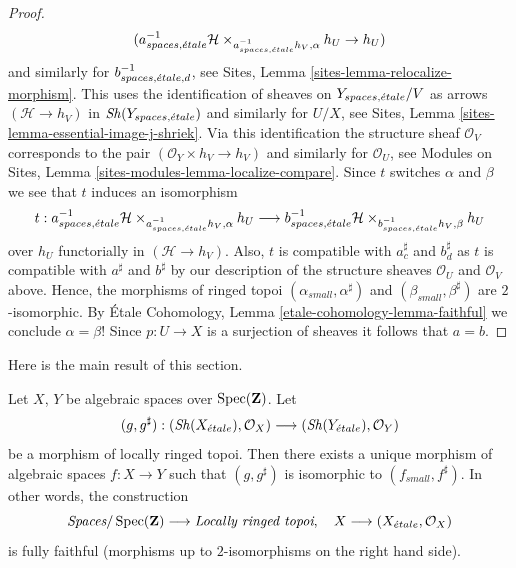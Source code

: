 \begin{proof}
$$(a_{spaces, {\acute{e}tale}}^{-1}\mathcal{H}
\times_{a_{spaces, {\acute{e}tale}}^{-1}h_V, \alpha}
h_U \to
h_U)
$$
and similarly for $b_{spaces, {\acute{e}tale}, d}^{-1}$, see
Sites, Lemma \ref{sites-lemma-relocalize-morphism}.
This uses the identification of sheaves on $Y_{spaces, {\acute{e}tale}}/V$
as arrows $(\mathcal{H} \to h_V)$ in $\mathop{\mathit{Sh}}\nolimits(Y_{spaces, {\acute{e}tale}})$
and similarly for $U/X$, see
Sites, Lemma \ref{sites-lemma-essential-image-j-shriek}.
Via this identification the structure sheaf $\mathcal{O}_V$ corresponds to the
pair $(\mathcal{O}_Y \times h_V \to h_V)$ and similarly
for $\mathcal{O}_U$, see
Modules on Sites,
Lemma \ref{sites-modules-lemma-localize-compare}.
Since $t$ switches $\alpha$ and $\beta$ we see that $t$ induces an isomorphism
$$
t :
a_{spaces, {\acute{e}tale}}^{-1}\mathcal{H}
\times_{a_{spaces, {\acute{e}tale}}^{-1}h_V, \alpha}
h_U
\longrightarrow
b_{spaces, {\acute{e}tale}}^{-1}\mathcal{H}
\times_{b_{spaces, {\acute{e}tale}}^{-1}h_V, \beta}
h_U
$$
over $h_U$ functorially in $(\mathcal{H} \to h_V)$. Also, $t$ is compatible
with $a_c^\sharp$ and $b_d^\sharp$ as $t$ is
compatible with $a^\sharp$ and $b^\sharp$ by our description
of the structure sheaves $\mathcal{O}_U$ and $\mathcal{O}_V$
above. Hence, the morphisms of ringed topoi
$(\alpha_{small}, \alpha^\sharp)$ and $(\beta_{small}, \beta^\sharp)$
are $2$-isomorphic. By
\'Etale Cohomology, Lemma \ref{etale-cohomology-lemma-faithful}
we conclude $\alpha = \beta$! Since $p : U \to X$ is a surjection
of sheaves it follows that $a = b$.
\end{proof}

\noindent
Here is the main result of this section.

\begin{theorem}
\label{theorem-fully-faithful}
Let $X$, $Y$ be algebraic spaces over $\mathop{\mathrm{Spec}}(\mathbf{Z})$.
Let
$$
(g, g^\sharp) :
(\mathop{\mathit{Sh}}\nolimits(X_{\acute{e}tale}), \mathcal{O}_X)
\longrightarrow
(\mathop{\mathit{Sh}}\nolimits(Y_{\acute{e}tale}), \mathcal{O}_Y)
$$
be a morphism of locally ringed topoi. Then there exists a
unique morphism of algebraic spaces $f : X \to Y$ such that
$(g, g^\sharp)$ is isomorphic to $(f_{small}, f^\sharp)$.
In other words, the construction
$$
\textit{Spaces}/\mathop{\mathrm{Spec}}(\mathbf{Z})
\longrightarrow \textit{Locally ringed topoi},
\quad
X \longrightarrow (X_{\acute{e}tale}, \mathcal{O}_X)
$$
is fully faithful (morphisms up to $2$-isomorphisms on the right hand side).
\end{theorem}


